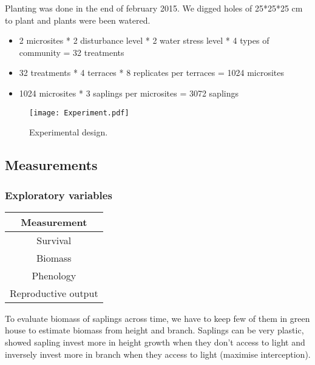 \documentclass[12pt]{article} %
\begin{document}
Planting was done in the end of february 2015. We digged holes of 25*25*25 cm to plant and plants were been watered.
\begin{itemize} %
\item 2 microsites * 2 disturbance level * 2 water stress level * 4 types of community = 32 treatments
\item 32 treatments * 4 terraces * 8 replicates per terraces = 1024 microsites
\item 1024 microsites * 3 saplings per microsites = 3072 saplings 
\end{itemize}

\begin{figure} %
\begin{center}
\texttt{[image: Experiment.pdf]}
\end{center}
\caption{Experimental design.\label{exp}}
\end{figure}

\subsection{Measurements}

\subsubsection{Exploratory variables}
\begin{table}[h]
\begin{center}
\begin{tabular}{c}
Measurement \\ 
\hline
Survival \\ 
Biomass \\ 
Phenology \\ 
Reproductive output \\
\hline 
\end{tabular}
\end{center}
\end{table} 
To evaluate biomass of saplings across time, we have to keep few of them in green house to estimate biomass from height and branch. Saplings can be very plastic, \citet{Bonser1994} showed sapling invest more in height growth when they don't access to light and inversely invest more in branch when they access to light (maximise interception). 
\end{document}
